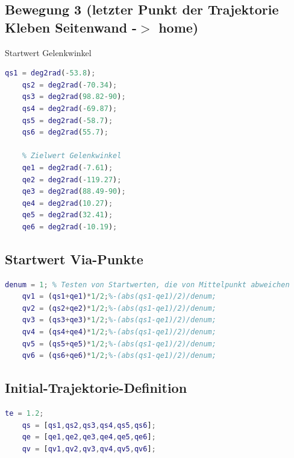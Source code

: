 \subsection{Bewegung 3 (letzter Punkt der Trajektorie Kleben Seitenwand -\ensuremath{>} home)}
%
\begin{par}
	Startwert Gelenkwinkel
\end{par} \vspace{1em}
\begin{lstlisting}[language=Matlab, numbers=none]
	qs1 = deg2rad(-53.8);
	qs2 = deg2rad(-70.34);
	qs3 = deg2rad(98.82-90);
	qs4 = deg2rad(-69.87);
	qs5 = deg2rad(-58.7);
	qs6 = deg2rad(55.7);
	
	% Zielwert Gelenkwinkel
	qe1 = deg2rad(-7.61);
	qe2 = deg2rad(-119.27);
	qe3 = deg2rad(88.49-90);
	qe4 = deg2rad(10.27);
	qe5 = deg2rad(32.41);
	qe6 = deg2rad(-10.19);
\end{lstlisting}
%
\subsection{Startwert Via-Punkte}
%
\begin{lstlisting}[language=Matlab, numbers=none]
	denum = 1; % Testen von Startwerten, die von Mittelpunkt abweichen
	qv1 = (qs1+qe1)*1/2;%-(abs(qs1-qe1)/2)/denum;
	qv2 = (qs2+qe2)*1/2;%-(abs(qs1-qe1)/2)/denum;
	qv3 = (qs3+qe3)*1/2;%-(abs(qs1-qe1)/2)/denum;
	qv4 = (qs4+qe4)*1/2;%-(abs(qs1-qe1)/2)/denum;
	qv5 = (qs5+qe5)*1/2;%-(abs(qs1-qe1)/2)/denum;
	qv6 = (qs6+qe6)*1/2;%-(abs(qs1-qe1)/2)/denum;
\end{lstlisting}
%
\subsection{Initial-Trajektorie-Definition}
%
\begin{lstlisting}[language=Matlab, numbers=none]
	te = 1.2;
	qs = [qs1,qs2,qs3,qs4,qs5,qs6];
	qe = [qe1,qe2,qe3,qe4,qe5,qe6];
	qv = [qv1,qv2,qv3,qv4,qv5,qv6];
\end{lstlisting}
%

